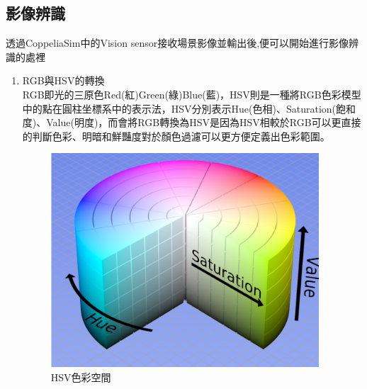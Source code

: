\documentclass[14pt,a4paper]{report}  %
\begin{document}
\subsection{影像辨識}
 透過CoppeliaSim中的Vision sensor接收場景影像並輸出後,便可以開始進行影像辨識的處裡\\
\begin{enumerate}
\item RGB與HSV的轉換\\
RGB即光的三原色Red(紅)Green(綠)Blue(藍)，HSV則是一種將RGB色彩模型中的點在圓柱坐標系中的表示法，HSV分別表示Hue(色相)、Saturation(飽和度)、Value(明度)，而會將RGB轉換為HSV是因為HSV相較於RGB可以更直接的判斷色彩、明暗和鮮豔度對於顏色過濾可以更方便定義出色彩範圍。\\
\begin{figure}[hbt!]
\center
\includegraphics[width=10cm]{HSV}
\caption{\Large HSV色彩空間}
\end{figure}


\end{enumerate}
\end{document}
